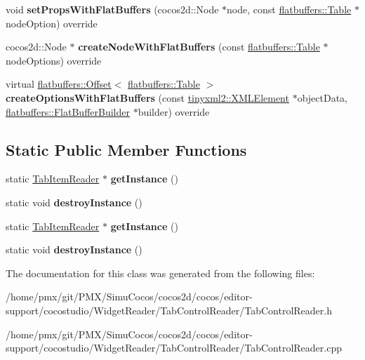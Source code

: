 \begin{DoxyCompactItemize}
\item 
\mbox{\label{classTabItemReader_a65289228e39c06dbf06d73ef431bef6e}} 
void {\bfseries set\+Props\+With\+Flat\+Buffers} (cocos2d\+::\+Node $\ast$node, const \hyperlink{classflatbuffers_1_1Table}{flatbuffers\+::\+Table} $\ast$node\+Option) override
\item 
\mbox{\label{classTabItemReader_a764d995d472f6773db4522d839916ac6}} 
cocos2d\+::\+Node $\ast$ {\bfseries create\+Node\+With\+Flat\+Buffers} (const \hyperlink{classflatbuffers_1_1Table}{flatbuffers\+::\+Table} $\ast$node\+Options) override
\item 
\mbox{\label{classTabItemReader_ac1cca0c49cdc8803a59665dcb903ba03}} 
virtual \hyperlink{structflatbuffers_1_1Offset}{flatbuffers\+::\+Offset}$<$ \hyperlink{classflatbuffers_1_1Table}{flatbuffers\+::\+Table} $>$ {\bfseries create\+Options\+With\+Flat\+Buffers} (const \hyperlink{classtinyxml2_1_1XMLElement}{tinyxml2\+::\+X\+M\+L\+Element} $\ast$object\+Data, \hyperlink{classflatbuffers_1_1FlatBufferBuilder}{flatbuffers\+::\+Flat\+Buffer\+Builder} $\ast$builder) override
\end{DoxyCompactItemize}
\subsection*{Static Public Member Functions}
\begin{DoxyCompactItemize}
\item 
\mbox{\label{classTabItemReader_a40f0ec80b9a869eee33670d56515e2ff}} 
static \hyperlink{classTabItemReader}{Tab\+Item\+Reader} $\ast$ {\bfseries get\+Instance} ()
\item 
\mbox{\label{classTabItemReader_a442cfb3f1522e44e6f085a89130f19b3}} 
static void {\bfseries destroy\+Instance} ()
\item 
\mbox{\label{classTabItemReader_a4c7b9e5d7f0c5e0ae25aa2d54013f3ac}} 
static \hyperlink{classTabItemReader}{Tab\+Item\+Reader} $\ast$ {\bfseries get\+Instance} ()
\item 
\mbox{\label{classTabItemReader_a2735db3c2f3920d3b75bed6325f1d636}} 
static void {\bfseries destroy\+Instance} ()
\end{DoxyCompactItemize}


The documentation for this class was generated from the following files\+:\begin{DoxyCompactItemize}
\item 
/home/pmx/git/\+P\+M\+X/\+Simu\+Cocos/cocos2d/cocos/editor-\/support/cocostudio/\+Widget\+Reader/\+Tab\+Control\+Reader/Tab\+Control\+Reader.\+h\item 
/home/pmx/git/\+P\+M\+X/\+Simu\+Cocos/cocos2d/cocos/editor-\/support/cocostudio/\+Widget\+Reader/\+Tab\+Control\+Reader/Tab\+Control\+Reader.\+cpp\end{DoxyCompactItemize}
